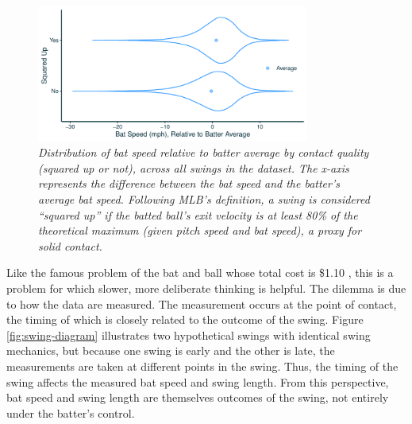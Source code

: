 \documentclass[
  12pt]{article}
\begin{document}
    \begin{figure}[H]
      \centering
      \includegraphics[width = 0.8\textwidth]{../../figures/counterintuitive.pdf}
      \caption{\it Distribution of bat speed relative to batter average by contact quality (squared up or not), across all swings in the dataset. The x-axis represents the difference between the bat speed and the batter's average bat speed. Following MLB's definition, a swing is considered ``squared up'' if the batted ball's exit velocity is at least 80\% of the theoretical maximum (given pitch speed and bat speed), a proxy for solid contact.}
      \label{fig:counterintuitive}
    \end{figure}

    Like the famous problem of the bat and ball whose total cost is \$1.10 \citep{kahneman_thinking_2011}, this is a problem for which slower, more deliberate thinking is helpful. The dilemma is due to how the data are measured. The measurement occurs at the point of contact, the timing of which is closely related to the outcome of the swing. Figure \ref{fig:swing-diagram} illustrates two hypothetical swings with identical swing mechanics, but because one swing is early and the other is late, the measurements are taken at different points in the swing. Thus, the timing of the swing affects the measured bat speed and swing length. From this perspective, bat speed and swing length are themselves outcomes of the swing, not entirely under the batter's control.
\end{document}
